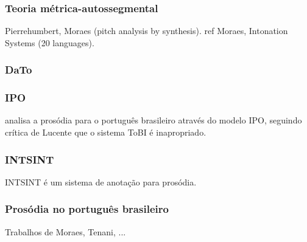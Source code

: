 \subsubsection{Teoria métrica-autossegmental}
Pierrehumbert, Moraes (pitch analysis by synthesis). ref Moraes, Intonation Systems (20 languages).
\subsubsection{DaTo}

\subsubsection{IPO}
\cite{ipo} analisa a prosódia para o português brasileiro através do modelo IPO,
seguindo crítica de Lucente que o sistema ToBI é inapropriado.
\subsubsection{INTSINT}
INTSINT é um sistema de anotação para prosódia.
\subsubsection{Prosódia no português brasileiro}
Trabalhos de Moraes, Tenani, ...